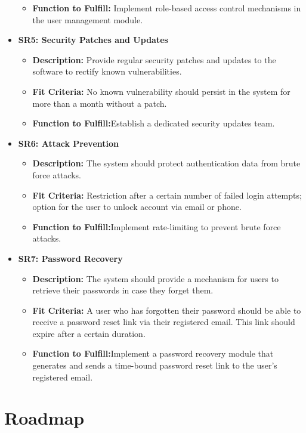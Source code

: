\documentclass{article}
\begin{document}
\begin{itemize}
\begin{itemize}
  \item \textbf{Function to Fulfill:} Implement role-based access control mechanisms in the user management module.
  \end{itemize}
\item \textbf{SR5: Security Patches and Updates}
  \begin{itemize}
  \item \textbf{Description:} Provide regular security patches and updates to the software to rectify known vulnerabilities.
  \item \textbf{Fit Criteria:} No known vulnerability should persist in the system for more than a month without a patch.
  \item \textbf{Function to Fulfill:}Establish a dedicated security updates team.
  \end{itemize}
\item \textbf{SR6: Attack Prevention}
  \begin{itemize}
  \item \textbf{Description:} The system should protect authentication data from brute force attacks.
  \item \textbf{Fit Criteria:} Restriction after a certain number of failed login attempts; option for the user to unlock account via email or phone.
  \item \textbf{Function to Fulfill:}Implement rate-limiting to prevent brute force attacks.
  \end{itemize}
\item \textbf{SR7: Password Recovery}
  \begin{itemize}
  \item \textbf{Description:} The system should provide a mechanism for users to retrieve their passwords in case they forget them.
  \item \textbf{Fit Criteria:} A user who has forgotten their password should be able to receive a password reset link via their registered email. This link should expire after a certain duration.
  \item \textbf{Function to Fulfill:}Implement a password recovery module that generates and sends a time-bound password reset link to the user's registered email.
  \end{itemize}
\end{itemize}

\section{Roadmap}
\end{document}
